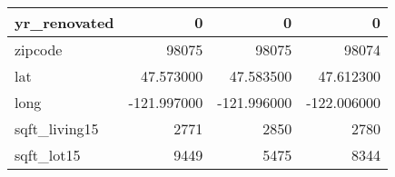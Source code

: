 \begin{table}[H]
\begin{tabular}{|l|r|r|r|}
\hline yr\_renovated & \cellcolor[rgb]{0.9, 0.54, 0.52} 0 & \cellcolor[rgb]{0.9, 0.54, 0.52} 0 & \cellcolor[rgb]{0.9, 0.54, 0.52} 0 \\
\hline zipcode & \cellcolor[rgb]{0.9, 0.54, 0.52} 98075 & \cellcolor[rgb]{0.9, 0.54, 0.52} 98075 & 98074 \\
\hline lat & \cellcolor[rgb]{0.9, 0.54, 0.52} 47.573000 & 47.583500 & 47.612300 \\
\hline long & \cellcolor[rgb]{0.9, 0.54, 0.52} -121.997000 & \cellcolor[rgb]{0.9, 0.54, 0.52} -121.996000 & \cellcolor[rgb]{0.9, 0.54, 0.52} -122.006000 \\
\hline sqft\_living15 & \cellcolor[rgb]{0.9, 0.54, 0.52} 2771 & 2850 & 2780 \\
\hline sqft\_lot15 & \cellcolor[rgb]{0.9, 0.54, 0.52} 9449 & 5475 & 8344 \\
\hline
\end{tabular}
\end{table}
